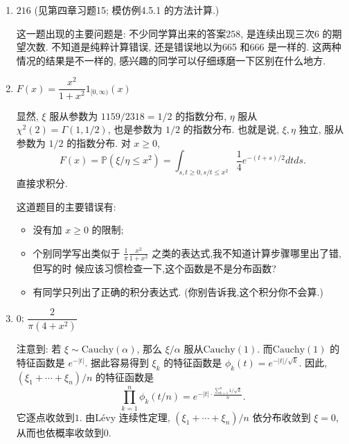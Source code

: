\begin{enumerate}
\begin{proofc}[解答]
\begin{enumerate}[label=(\arabic*)]
下面来严格地给出证明.由于 $x_{n}$ 独立, 都服从圆内的均匀分布, 这意味着 $\theta_{n}$ 独立, 且服从圆周 $S$ 上的均匀分布. 对于 $\omega \in \Omega$, 不妨设
\[A(\omega ):=\left\{ \theta _{n}(\omega ):1\leq n\leq 2026\right\}\]
中的点各不相同. 于是, $\omega \in \Lambda$, 当且仅当存在唯一的 $n$ 使得 $A(\omega) \subset S_{+}(\theta_{n}(\omega))$. 我们有
\[
\begin{aligned}
\mathbb{P}(\Lambda) & =\mathbb{P}\left(\bigcup_{n=1}^{2026}\left\{\omega \in \Omega: A(\omega) \subset S_{+}(\theta_{n}(\omega))\right\}\right) \\
& =\sum_{n=1}^{2026} \mathbb{P}(A \subset S_{+}(\theta_{n}))=2026 \mathbb{P}(A \subset S_{+}(\theta_{1})).
\end{aligned}
\]
第二个等式是因为括号里的事件是无交并, 第三个等式用到了对称性(Fubini 定理保证). 
用独立性容易计算 $\mathbb{P}(A \subset S_{+}(\theta_{1}))=1 / 2^{2025}$.

\item $\boxed{216}$ (见第四章习题15; 模仿例4.5.1 的方法计算.)

这一题出现的主要问题是: 不少同学算出来的答案$258$, 是连续出现三次6 的期望次数. 
不知道是纯粹计算错误, 还是错误地以为665 和666 是一样的. 
这两种情况的结果是不一样的, 感兴趣的同学可以仔细琢磨一下区别在什么地方.

\item $\boxed{F(x)=\dfrac{x^{2}}{1+x^{2}} 1_{[0, \infty)}(x)}$

显然, $\xi$ 服从参数为 $1159 / 2318=1 / 2$ 的指数分布, $\eta$ 服从 $\chi^{2}(2)=\Gamma(1,1 / 2)$, 也是参数为 $1/2$ 的指数分布. 也就是说, $\xi, \eta$ 独立, 服从参数为 $1/2$ 的指数分布. 对 $x \geq 0$,
\[F(x)=\mathbb{P}\left(\xi / \eta \leq x^{2}\right)=\int_{s, t \geq 0, s / t \leq x^{2}} \frac{1}{4} e^{-(t+s) / 2} d t d s .\]
直接求积分.

这道题目的主要错误有:
\begin{itemize}
\item 没有加 $x \geq 0$ 的限制;
\item 个别同学写出类似于 $\frac{1}{\pi} \frac{x^{2}}{1+x^{2}}$ 之类的表达式,我不知道计算步骤哪里出了错,但写的时
候应该习惯检查一下,这个函数是不是分布函数?
\item 有同学只列出了正确的积分表达式. (你别告诉我,这个积分你不会算.)
\end{itemize}

\item $\boxed{0}$; $\boxed{\dfrac{2}{\pi\left(4+x^{2}\right)}}$

注意到: 若 $\xi \sim \text{Cauchy}(\alpha)$, 那么 $\xi / \alpha$ 服从$\text{Cauchy}(1)$. 而$\text{Cauchy}(1)$ 的特征函数是 $e^{-|t|}$. 据此容易得到 $\xi_{k}$ 的特征函数是 $\phi_{k}(t)=e^{-|t| / \sqrt{k}}$.
因此, $(\xi_{1}+\cdots+\xi_{n}) / n$ 的特征函数是
\[
\prod_{k=1}^{n} \phi_{k}(t / n)=e^{-|t| \cdot \frac{\sum_{k=1}^{n} 1 / \sqrt{k}}{n}} .
\]
它逐点收敛到$1$. 由Lévy 连续性定理, $(\xi_{1}+\cdots+\xi_{n}) / n$ 依分布收敛到 $\xi=0$, 从而也依概率收敛到$0$.


\end{enumerate}
\end{proofc}
\end{enumerate}
